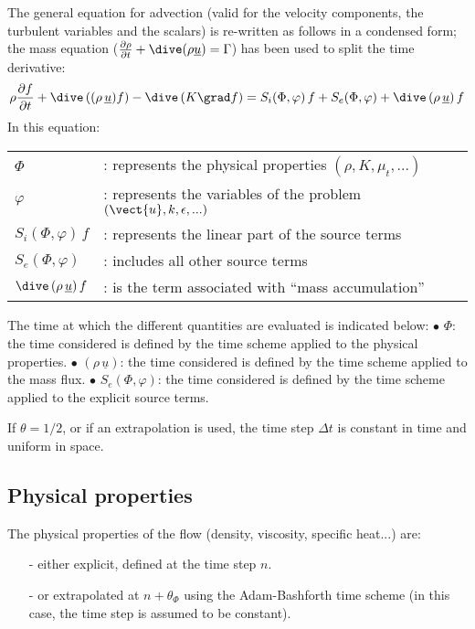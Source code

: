 The general equation for advection (valid for the velocity components, the
turbulent variables and the scalars) is re-written as follows in a condensed
form; the mass equation ($\frac{\partial \rho } {\partial t}+ \dive(\rho
\underline{u}) = \Gamma$) has been used to split the time derivative:
\begin{equation}  \label{Base_Introd_simple}
\rho \frac {\partial f}{\partial t} + \dive\,((\rho\,\underline{u}) f) - %
\dive\,(K \grad f) = S_{i}(\Phi,\varphi)\,f + S_{e}(\Phi,\varphi) + \dive%
\,(\rho\,\underline{u})\,f
\end{equation}
In this equation:\newline
\begin{tabular}{ll}
$\Phi$ & : represents the physical properties $(\rho,K,\mu_{t},...)$ \\
$\varphi$ & : represents the variables of the problem $(\vect{u}%
,k,\epsilon,...)$ \\
$S_{i}(\Phi,\varphi)\,f$ & : represents the linear part of the source terms
\\
$S_{e}(\Phi,\varphi)$ & : includes all other source terms \\
$\dive\,(\rho\,\underline{u})\,f$ & : is the term associated with ``mass
accumulation''%
\end{tabular}
\newline
\newline

The time at which the different quantities are evaluated is indicated below:%
\newline
$\bullet$ $\Phi$: the time considered is defined by the time scheme applied
to the physical properties.\newline
$\bullet$ $(\rho\,\underline{u})$: the time considered is defined by the
time scheme applied to the mass flux.\newline
$\bullet$ $S_{e}(\Phi,\varphi)$: the time considered is defined by the time
scheme applied to the explicit source terms.

If $\theta=1/2$, or if an extrapolation is used, the time step $\Delta t$ is
constant in time and uniform in space.

\subsection{Physical properties}

The physical properties of the flow (density, viscosity, specific heat...)
are:

\begin{itemize}
\item[-] either explicit, defined at the time step $n$.

\item[-] or extrapolated at $n+\theta _{\Phi }$ using the Adam-Bashforth
time scheme (in this case, the time step is assumed to be constant).
\end{itemize}

